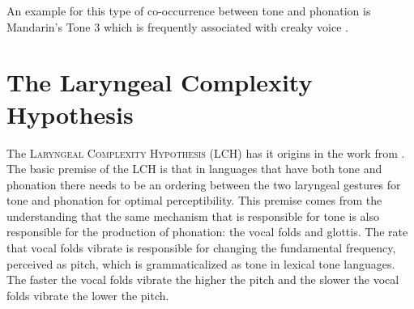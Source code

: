 \documentclass[12pt, letterpaper]{article}
\begin{document}
An example for this type of co-occurrence between tone and phonation is Mandarin's Tone 3 which is frequently associated with creaky voice \citep{hockettPeipingPhonology1947,}.




\section{The Laryngeal Complexity Hypothesis} \label{sec:Silverman}

The \textsc{Laryngeal Complexity Hypothesis} (LCH) has it origins in the work from \citet{silvermanLaryngealComplexityOtomanguean1997,blankenshipTimeCourseBreathiness1997,blankenshipTimingNonmodalPhonation2002}. The basic premise of the LCH is that in languages that have both tone and phonation there needs to be an ordering between the two laryngeal gestures for tone and phonation for optimal perceptibility. This premise comes from the understanding that the same mechanism that is responsible for tone is also responsible for the production of phonation: the vocal folds and glottis. The rate that vocal folds vibrate is responsible for changing the fundamental frequency, perceived as pitch, which is grammaticalized as tone in lexical tone languages. The faster the vocal folds vibrate the higher the pitch and the slower the vocal folds vibrate the lower the pitch. 
\end{document}
